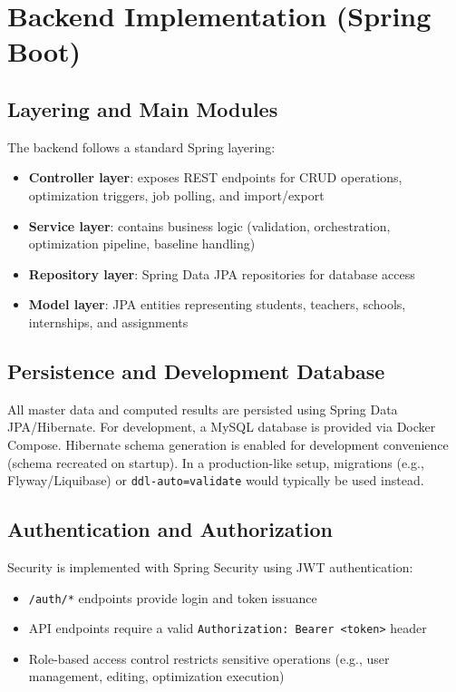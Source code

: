 \documentclass[12pt,a4paper]{report}
\begin{document}
\section{Backend Implementation (Spring Boot)}

\subsection{Layering and Main Modules}

The backend follows a standard Spring layering:

\begin{itemize}
    \item \textbf{Controller layer}: exposes REST endpoints for CRUD operations, optimization triggers, job polling, and import/export
    \item \textbf{Service layer}: contains business logic (validation, orchestration, optimization pipeline, baseline handling)
    \item \textbf{Repository layer}: Spring Data JPA repositories for database access
    \item \textbf{Model layer}: JPA entities representing students, teachers, schools, internships, and assignments
\end{itemize}

\subsection{Persistence and Development Database}

All master data and computed results are persisted using Spring Data JPA/Hibernate. For development, a MySQL database is provided via Docker Compose. Hibernate schema generation is enabled for development convenience (schema recreated on startup). In a production-like setup, migrations (e.g., Flyway/Liquibase) or \texttt{ddl-auto=validate} would typically be used instead.

\subsection{Authentication and Authorization}

Security is implemented with Spring Security using JWT authentication:

\begin{itemize}
    \item \texttt{/auth/*} endpoints provide login and token issuance
    \item API endpoints require a valid \texttt{Authorization: Bearer <token>} header
    \item Role-based access control restricts sensitive operations (e.g., user management, editing, optimization execution)
\end{itemize}
\end{document}
